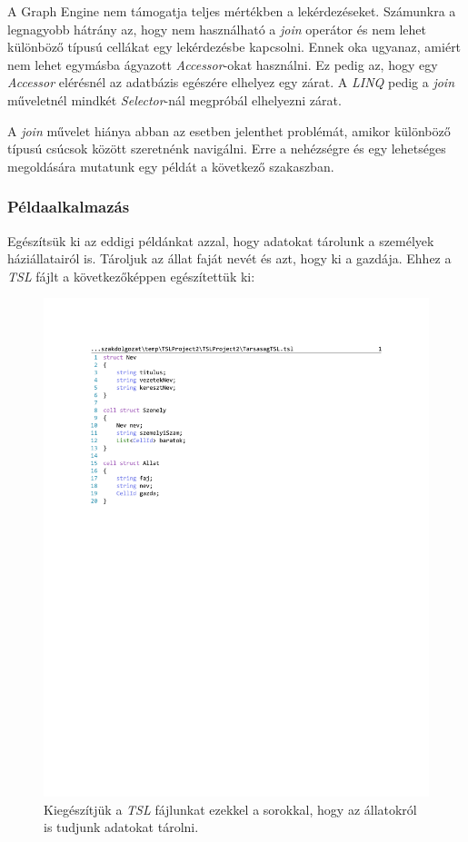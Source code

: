 A Graph Engine nem támogatja teljes mértékben a lekérdezéseket. Számunkra a legnagyobb hátrány az, hogy nem használható a \emph{join} operátor és nem lehet különböző típusú cellákat egy lekérdezésbe kapcsolni. Ennek oka ugyanaz, amiért nem lehet egymásba ágyazott \emph{Accessor}-okat használni. Ez pedig az, hogy egy \emph{Accessor} elérésnél az adatbázis egészére elhelyez egy zárat. A \emph{LINQ} pedig a \emph{join} műveletnél mindkét \emph{Selector}-nál megpróbál elhelyezni zárat.

A \emph{join} művelet hiánya abban az esetben jelenthet problémát, amikor különböző típusú csúcsok között szeretnénk navigálni. Erre a nehézségre és egy lehetséges megoldására mutatunk egy példát a következő szakaszban.

\subsubsection{Példaalkalmazás}

Egészítsük ki az eddigi példánkat azzal, hogy adatokat tárolunk a személyek háziállatairól is. Tároljuk az állat faját nevét és azt, hogy ki a gazdája. Ehhez a \emph{TSL} fájlt a következőképpen egészítettük ki:

\begin{figure}[H]
	\centering
	\includegraphics[]{figures/TarsasagAllatTSL.pdf}
	\caption{Kiegészítjük a \emph{TSL} fájlunkat ezekkel a sorokkal, hogy az állatokról is tudjunk adatokat tárolni.}
	\label{fig:TarsasagAllat}
\end{figure}

